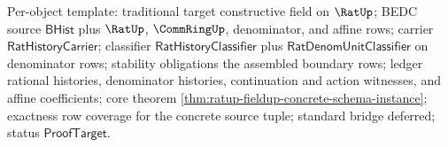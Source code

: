 Per-object template: traditional target constructive field on $\RatUp$; BEDC
source $\mathsf{BHist}$ plus $\RatUp$, $\CommRingUp$, denominator, and affine
rows; carrier $\mathsf{RatHistoryCarrier}$; classifier
$\mathsf{RatHistoryClassifier}$ plus $\mathsf{RatDenomUnitClassifier}$ on
denominator rows; stability obligations the assembled boundary rows; ledger
rational histories, denominator histories, continuation and action witnesses,
and affine coefficients; core theorem
\autoref{thm:ratup-fieldup-concrete-schema-instance}; exactness row coverage
for the concrete source tuple; standard bridge deferred; status
$\mathsf{ProofTarget}$.
